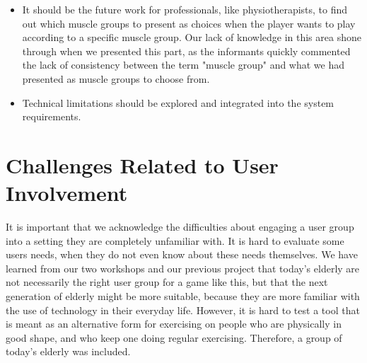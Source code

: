 \begin{itemize}
\item It should be the future work for professionals, like physiotherapists, to find out which muscle groups to present as choices when the player wants to play according to a specific muscle group. Our lack of knowledge in this area shone through when we presented this part, as the informants quickly commented the lack of consistency between the term "muscle group" and what we had presented as muscle groups to choose from. 
\item Technical limitations should be explored and integrated into the system requirements.
\end{itemize}

\section{Challenges Related to User Involvement}

It is important that we acknowledge the difficulties about engaging a user group into a setting they are completely unfamiliar with. It is hard to evaluate some users needs, when they do not even know about these needs themselves. We have learned from our two workshops and our previous project \cite{project} that today's elderly are not necessarily the right user group for a game like this, but that the next generation of elderly might be more suitable, because they are more familiar with the use of technology in their everyday life. However, it is hard to test a tool that is meant as an alternative form for exercising on people who are physically in good shape, and who keep one doing regular exercising. Therefore, a group of today's elderly was included.

